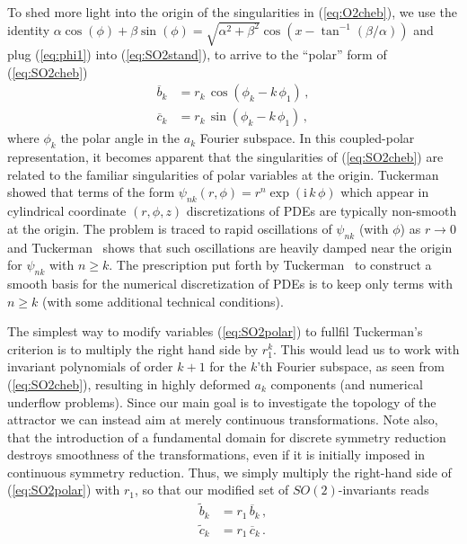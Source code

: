 \documentclass[aip,cha,showpacs,twocolumn,
 		  reprint]{revtex4-1} %
\newcommand{\bseq}{\begin{subequations}}
\newcommand{\eseq}{\end{subequations}}
\newcommand{\rf}     [1] {~\cite{#1}}
\newcommand{\refeq}  [1] {(\ref{#1})}
\newcommand{\ii}{\ensuremath{\mathrm{i}}} %
\begin{document}
To shed more light into the origin of the singularities in \refeq{eq:O2cheb},
we use the identity
$\alpha\cos(\phi)+\beta\sin(\phi)=\sqrt{\alpha^2+\beta^2}\cos(x-\tan^{-1}(\beta/\alpha))$
and plug \refeq{eq:phi1} into \refeq{eq:SO2stand}, to arrive to the
``polar'' form of \refeq{eq:SO2cheb}
\bseq\label{eq:SO2polar}
  \begin{align}
    \overline{b}_k &=
		    r_k\, \cos(\phi_k-k\,\phi_1)\,, \label{eq:SO2polar1}\\
    \overline{c}_k &=
		    r_k\, \sin(\phi_k-k\,\phi_1)\,,\label{eq:SO2polar2}
  \end{align}
\eseq
where $\phi_k$ the polar angle in the $a_k$ Fourier subspace. In this coupled-polar
representation, it becomes apparent that the singularities of \refeq{eq:SO2cheb}
are related to the familiar singularities of polar variables at the origin.
Tuckerman\rf{tuckerman89} showed that terms of the form $\psi_{nk}(r,\phi)=r^n\exp(\ii\, k\,\phi)$
which appear in cylindrical coordinate $(r,\phi,z)$ discretizations of PDEs
are typically non-smooth at the origin. The problem is traced to rapid
oscillations of $\psi_{nk}$ (with $\phi$) as $r\rightarrow0$ and Tuckerman\rf{tuckerman89} shows
that such oscillations are heavily damped near the origin for
$\psi_{nk}$ with $n\geq k$. The prescription put forth by Tuckerman\rf{tuckerman89} to
construct a smooth basis for the numerical discretization of
PDEs is to keep only terms with $n\geq k$
(with some additional technical conditions).

The simplest way to modify variables \refeq{eq:SO2polar} to fullfil Tuckerman's
criterion is to multiply the right hand side by $r_1^k$. This would lead us to
work with invariant polynomials of order $k+1$ for the $k$'th Fourier subspace,
as seen from \refeq{eq:SO2cheb}, resulting in highly deformed $a_k$ components
(and numerical underflow problems). Since our main goal is to investigate the
topology of the attractor we can instead aim at merely continuous transformations.
Note also, that the introduction of a fundamental domain for discrete symmetry
reduction destroys smoothness of the transformations, even if it is initially
imposed in continuous symmetry reduction.
Thus, we simply multiply the right-hand side of \refeq{eq:SO2polar} with $r_1$,
so that our modified set of $SO(2)$-invariants reads
\bseq\label{eq:SO2polarCont}
  \begin{align}
    \tilde{b}_k &=
		    r_1\,\overline{b}_k\,, \label{eq:SO2polarCont1}\\
    \tilde{c}_k &=
		    r_1\,\overline{c}_k\,.\label{eq:SO2polarCont2}
  \end{align}
\eseq
\end{document}
